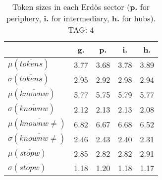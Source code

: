 \begin{table}[h!]
\begin{center}
\begin{tabular}{| l | c | c | c | c |}\hline
 & g. & p. & i. & h. \\\hline
$\mu(\overline{tokens})$ & 3.77  & 3.68  & 3.78  & 3.89 \\\hline
$\sigma(\overline{tokens})$ & 2.95  & 2.92  & 2.98  & 2.94 \\\hline
$\mu(\overline{knownw})$ & 5.77  & 5.75  & 5.79  & 5.77 \\\hline
$\sigma(\overline{knownw})$ & 2.12  & 2.13  & 2.13  & 2.08 \\\hline
$\mu(\overline{knownw \neq})$ & 6.82  & 6.67  & 6.68  & 6.52 \\\hline
$\sigma(\overline{knownw \neq})$ & 2.46  & 2.43  & 2.40  & 2.31 \\\hline
$\mu(\overline{stopw})$ & 2.85  & 2.82  & 2.82  & 2.91 \\\hline
$\sigma(\overline{stopw})$ & 1.18  & 1.20  & 1.18  & 1.17 \\\hline
\end{tabular}
\caption{Token sizes in each Erd\"os sector ({{\bf p.}} for periphery, {{\bf i.}} for intermediary, {{\bf h.}} for hubs). TAG: 4}
\end{center}
\end{table}